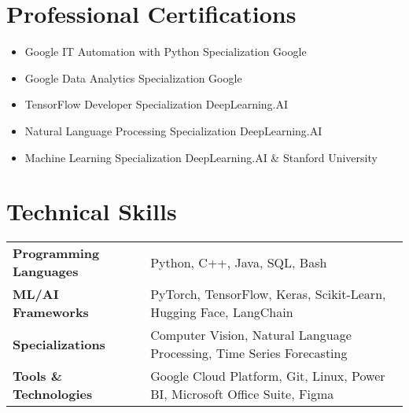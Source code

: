 \documentclass[a4paper,10pt]{article}
\begin{document}
\section{Professional Certifications}
\begin{itemize}[nosep, leftmargin=1em, itemsep=2pt, label=\textbullet]
\item Google IT Automation with Python Specialization \hfill Google
\item Google Data Analytics Specialization \hfill Google
\item TensorFlow Developer Specialization \hfill DeepLearning.AI
\item Natural Language Processing Specialization \hfill DeepLearning.AI
\item Machine Learning Specialization \hfill DeepLearning.AI \& Stanford University
\end{itemize}

\section{Technical Skills}
\begin{tabularx}{\linewidth}{@{}l X@{}}
\textbf{Programming Languages} & Python, C++, Java, SQL, Bash \\
\textbf{ML/AI Frameworks} & PyTorch, TensorFlow, Keras, Scikit-Learn, Hugging Face, LangChain \\
\textbf{Specializations} & Computer Vision, Natural Language Processing, Time Series Forecasting \\
\textbf{Tools \& Technologies} & Google Cloud Platform, Git, Linux, Power BI, Microsoft Office Suite, Figma \\
\end{tabularx}
\end{document}
